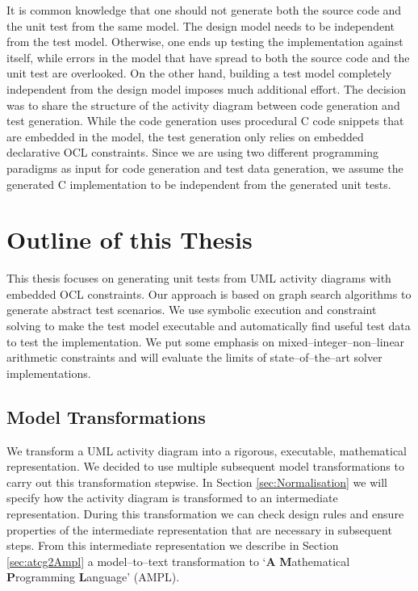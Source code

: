 It is common knowledge that one should not generate both the source code and the unit test from the same model. The design model needs to be independent from the test model. Otherwise, one ends up testing the implementation against itself, while errors in the model that have spread to both the source code and the unit test are overlooked. %
On the other hand, building a test model completely independent from the design model imposes much additional effort. The decision was to share the structure of the activity diagram between code generation and test generation. While the code generation uses procedural C code snippets that are embedded in the model, the test generation only relies on embedded declarative OCL constraints. Since we are using two different programming paradigms as input for code generation and test data generation, we assume the generated C implementation to be independent from the generated unit tests.
\section{Outline of this Thesis}
This thesis focuses on generating unit tests from UML activity diagrams with embedded OCL constraints. Our approach is based on graph search algorithms to generate abstract test scenarios. We use symbolic execution and constraint solving to make the test model executable and automatically find useful test data to test the implementation. We put some emphasis on mixed--integer--non--linear arithmetic constraints and will evaluate the limits of state--of--the--art solver implementations.
\subsection{Model Transformations}
We transform a UML activity diagram into a rigorous, executable, mathematical representation. We decided to use multiple subsequent model transformations to carry out this transformation stepwise. In Section \ref{sec:Normalisation} we will specify how the activity diagram is transformed to an intermediate representation. During this transformation we can check design rules and ensure properties of the intermediate representation that are necessary in subsequent steps. From this intermediate representation we describe in Section \ref{sec:atcg2Ampl} a model--to--text transformation to `\textbf{A} \textbf{M}athematical \textbf{P}rogramming \textbf{L}anguage' (AMPL).
